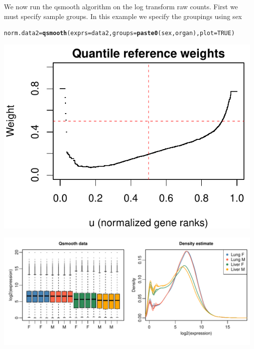 \documentclass{article}\usepackage[]{graphicx}\usepackage[usenames,dvipsnames]{color}
\makeatletter
\def\maxwidth{ %
  \ifdim\Gin@nat@width>\linewidth
    \linewidth
  \else
    \Gin@nat@width
  \fi
}
\newcommand{\hlnum}[1]{\textcolor[rgb]{0.686,0.059,0.569}{#1}}%
\newcommand{\hlstd}[1]{\textcolor[rgb]{0.345,0.345,0.345}{#1}}%
\newcommand{\hlkwb}[1]{\textcolor[rgb]{0.69,0.353,0.396}{#1}}%
\newcommand{\hlkwc}[1]{\textcolor[rgb]{0.333,0.667,0.333}{#1}}%
\newcommand{\hlkwd}[1]{\textcolor[rgb]{0.737,0.353,0.396}{\textbf{#1}}}%
\newenvironment{kframe}{%
 \def\at@end@of@kframe{}%
 \ifinner\ifhmode%
  \def\at@end@of@kframe{\end{minipage}}%
  \begin{minipage}{\columnwidth}%
 \fi\fi%
 \def\FrameCommand##1{\hskip\@totalleftmargin \hskip-\fboxsep
 \colorbox{shadecolor}{##1}\hskip-\fboxsep
     \hskip-\linewidth \hskip-\@totalleftmargin \hskip\columnwidth}%
 \MakeFramed {\advance\hsize-\width
   \@totalleftmargin\z@ \linewidth\hsize
   \@setminipage}}%
 {\par\unskip\endMakeFramed%
 \at@end@of@kframe}
\newenvironment{knitrout}{}{} %
\makeatother
\begin{document}
We now run the qsmooth algorithm on the log transform raw counts.
First we must specify sample groups. In this example we specify
the groupings using sex 
\begin{knitrout}
\color{fgcolor}\begin{kframe}
\begin{alltt}
\hlstd{norm.data2} \hlkwb{=} \hlkwd{qsmooth}\hlstd{(}\hlkwc{exprs}\hlstd{=data2,} \hlkwc{groups}\hlstd{=}\hlkwd{paste0}\hlstd{(sex, organ),} \hlkwc{plot}\hlstd{=}\hlnum{TRUE}\hlstd{)}
\end{alltt}
\end{kframe}

{\centering \includegraphics[width=\maxwidth]{figure/qsmooth12-1} 

}



\end{knitrout}

\begin{knitrout}
\color{fgcolor}

{\centering \includegraphics[width=\maxwidth]{figure/norm_data12-1} 

}



\end{knitrout}
\end{document}
